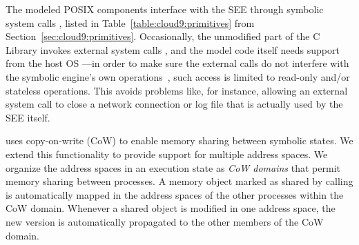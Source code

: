 The modeled POSIX components interface with the SEE through symbolic system calls \cV, listed in Table~\ref{table:cloud9:primitives} from Section~\ref{sec:cloud9:primitives}.
%
Occasionally, the unmodified part of the C Library invokes external system calls \cVI, and the model code itself needs support from the host OS \cVII---in order to make sure the external calls do not interfere with the symbolic engine's own operations~\cVIII, such access is limited to read-only and/or stateless operations.  This avoids problems like, for instance, allowing an external  system call to close a network connection or log file that is actually used by the SEE itself.

\klee uses copy-on-write (CoW) to enable memory sharing between symbolic states.
%
We extend this functionality to provide support for multiple address spaces.
%
We organize the address spaces in an execution state as \emph{CoW domains} that permit memory sharing between processes.
%
A memory object marked as shared by calling  is automatically mapped in the address spaces of the other processes within the CoW domain.  Whenever a shared object is modified in one address space, the new version is automatically propagated to the other members of the CoW domain.

